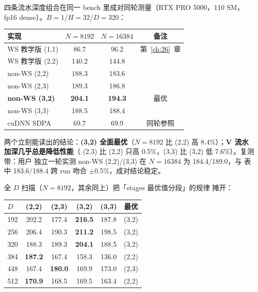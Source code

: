 四条流水深度组合在同一 bench 里成对同轮测量（RTX PRO 5000，110 SM，
fp16 dense）。$B{=}1$/$H{=}32$/$D{=}320$：

\begin{center}
\begin{tabular}{lccc}
\toprule
实现 & $N{=}8192$ & $N{=}16384$ & 备注 \\
\midrule
WS 教学版 (1,1) & 86.7 & 96.2 & 第~\ref{ch:26}~章 \\
WS 教学版 (2,2) & 140.2 & 144.8 & \\
non-WS (2,2) & 188.3 & 183.6 & \\
non-WS (2,3) & 189.3 & 186.8 & \\
\textbf{non-WS (3,2)} & \textbf{204.1} & \textbf{194.3} & 最优 \\
non-WS (3,3) & 188.5 & 188.4 & \\
cuDNN SDPA & 69.7 & 69.9 & 同轮参照 \\
\bottomrule
\end{tabular}
\end{center}

两个立刻能读出的结论：\textbf{(3,2) 全面最优}（$N{=}8192$ 比 (2,2)
高 8.4\%）；\textbf{V 流水加深几乎总是降低性能}（
(2,3) 比 (2,2) 只高 0.5\%，(3,3) 比 (3,2) 低 7.6\%）。复测带：用户
独立一轮实测 non-WS (2,2)/(3,3) 在 $N{=}16384$ 为 184.4/189.0，与
表中 183.6/188.4 跨 run 吻合 $\pm$0.5\%，成对结论稳定。

全 $D$ 扫描（$N{=}8192$，其余同上）把「stages 最优值分段」的规律
摊开：

\begin{center}
\begin{tabular}{lccccc}
\toprule
$D$ & (2,2) & (2,3) & (3,2) & (3,3) & 最优 \\
\midrule
192 & 202.2 & 177.4 & \textbf{216.5} & 187.8 & (3,2) \\
256 & 206.4 & 190.3 & \textbf{211.2} & 198.5 & (3,2) \\
320 & 188.3 & 189.3 & \textbf{204.1} & 188.5 & (3,2) \\
384 & \textbf{187.2} & 167.4 & 158.3 & 136.0 & (2,2) \\
448 & 167.4 & \textbf{180.0} & 169.9 & 173.0 & (2,3) \\
512 & \textbf{170.9} & 168.5 & 169.5 & 163.4 & (2,2) \\
\bottomrule
\end{tabular}
\end{center}


